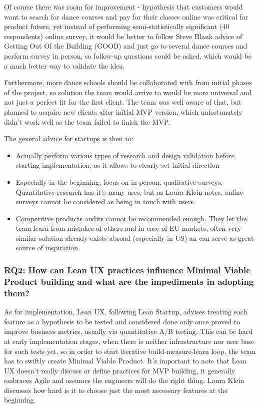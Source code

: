 \documentclass{article}
\begin{document}
Of course there was room for improvement - hypothesis that customers would want to search for dance courses and pay for their classes online was critical for product future, yet instead of performing semi-statistically significant (40 respondents) online survey, it would be better to follow Steve Blank \cite{blank2013four} advice of Getting Out Of the Building (GOOB) and just go to several dance courses and perform survey in person, so follow-up questions could be asked, which would be a much better way to validate the idea.

Furthermore, more dance schools should be collaborated with from initial phases of the project, so solution the team would arrive to would be more universal and not just a perfect fit for the first client. The team was well aware of that, but planned to acquire new clients after initial MVP version, which unfortunately didn't work well as the team failed to finish the MVP.

The general advice for startups is then to:
\begin{itemize}
\item Actually perform various types of research and design validation before starting implementation, as it allows to clearly set initial direction
\item Especially in the beginning, focus on in-person, qualitative surveys. Quantitative research has it's many uses, but as Laura Klein \cite{klein2013ux} notes, online surveys cannot be considered as being in touch with users.
\item Competitive products audits cannot be recommended enough. They let the team learn from mistakes of others and in case of EU markets, often very similar solution already exists abroad (especially in US) an can serve as great source of inspiration.
\end{itemize}

\subsubsection{RQ2: How can Lean UX practices influence Minimal Viable Product building and what are the impediments in adopting them?}
As for implementation, Lean UX, following Lean Startup, advises treating each feature as a hypothesis to be tested and considered done only once proved to improve business metrics, usually via quantitative A/B testing. This can be hard at early implementation stages, when there is neither infrastructure nor user base for such tests yet, so in order to start iterative build-measure-learn loop, the team has to swiftly create Minimal Viable Product. It's important to note that Lean UX doesn't really discuss or define practices for MVP building, it generally embraces Agile and assumes the engineers will do the right thing. Laura Klein \cite{klein2013ux} discusses how hard is it to choose just the most necessary features at the beginning.
\end{document}
